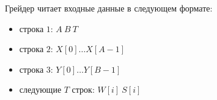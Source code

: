 Грейдер читает входные данные в следующем формате:
\begin{itemize}
\item строка $1$: $A\ B\ T$
\item строка $2$: $X[0]\dots X[A­ - 1]$
\item строка $3$: $Y[0]\dots Y[B - ­1]$
\item следующие $T$ строк: $W[i]\ S[i]$
\end{itemize}
